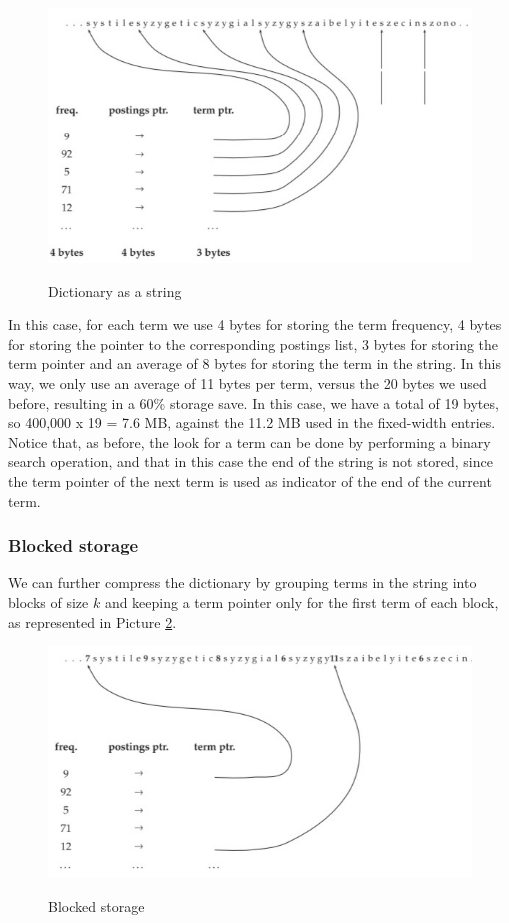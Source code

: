 \begin{figure}[h!]
		\centering
		\includegraphics[scale = 1.7]{img/dictionary string_2.jpg}
		\label{dic string 2}
        \caption{Dictionary as a string}
\end{figure}

In this case, for each term we use 4 bytes for storing the term frequency, 4 bytes for storing the pointer to the corresponding postings list, 3 bytes for storing the term pointer and an average of 8 bytes for storing the term in the string. In this way, we only use an average of 11 bytes per term, versus the 20 bytes we used before, resulting in a 60\% storage save. In this case, we have a total of 19 bytes, so 400,000 x 19 = 7.6 MB, against the 11.2 MB used in the fixed-width entries. Notice that, as before, the look for a term can be done by performing a binary search operation, and that in this case the end of the string is not stored, since the term pointer of the next term is used as indicator of the end of the current term.

\subsubsection{Blocked storage}
We can further compress the dictionary by grouping terms in the string into blocks of size $k$ and keeping a term pointer only for the first term of each block, as represented in Picture \ref{blocked}.

\begin{figure}[h!]
		\centering
		\includegraphics[scale = 1.7]{img/blocked storage.jpg}
		\label{blocked}
        \caption{Blocked storage}
\end{figure}

